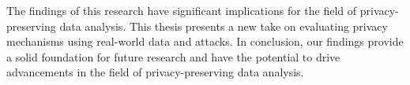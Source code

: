 The findings of this research have significant implications for the field of privacy-preserving data analysis.
This thesis presents a new take on evaluating privacy mechanisms using real-world data and attacks.
In conclusion, our findings provide a solid foundation for future research and have the potential to drive advancements in the field of privacy-preserving data analysis.


